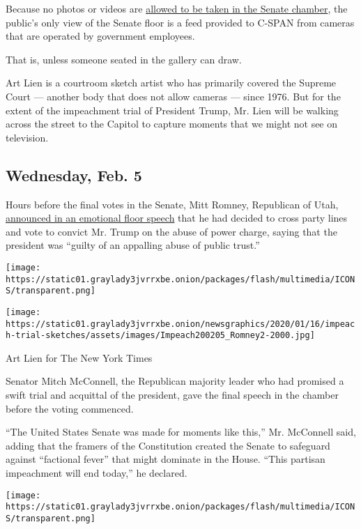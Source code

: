 Because no photos or videos are
\href{https://www.nytimes3xbfgragh.onion/2019/01/13/us/politics/senate-photography.html}{allowed
to be taken in the Senate chamber}, the public's only view of the Senate
floor is a feed provided to C-SPAN from cameras that are operated by
government employees.

That is, unless someone seated in the gallery can draw.

Art Lien is a courtroom sketch artist who has primarily covered the
Supreme Court --- another body that does not allow cameras --- since
1976. But for the extent of the impeachment trial of President Trump,
Mr. Lien will be walking across the street to the Capitol to capture
moments that we might not see on television.

\hypertarget{wednesday-feb-5}{%
\subsection{Wednesday, Feb. 5}\label{wednesday-feb-5}}

Hours before the final votes in the Senate, Mitt Romney, Republican of
Utah,
\href{https://www.nytimes3xbfgragh.onion/2020/02/05/us/politics/mitt-romney-impeachment-speech-transcript.html}{announced
in an emotional floor speech} that he had decided to cross party lines
and vote to convict Mr. Trump on the abuse of power charge, saying that
the president was ``guilty of an appalling abuse of public trust.''

\texttt{[image: https://static01.graylady3jvrrxbe.onion/packages/flash/multimedia/ICONS/transparent.png]}

\texttt{[image: https://static01.graylady3jvrrxbe.onion/newsgraphics/2020/01/16/impeach-trial-sketches/assets/images/Impeach200205\_Romney2-2000.jpg]}

Art Lien for The New York Times

Senator Mitch McConnell, the Republican majority leader who had promised
a swift trial and acquittal of the president, gave the final speech in
the chamber before the voting commenced.

``The United States Senate was made for moments like this,'' Mr.
McConnell said, adding that the framers of the Constitution created the
Senate to safeguard against ``factional fever'' that might dominate in
the House. ``This partisan impeachment will end today,'' he declared.

\texttt{[image: https://static01.graylady3jvrrxbe.onion/packages/flash/multimedia/ICONS/transparent.png]}

